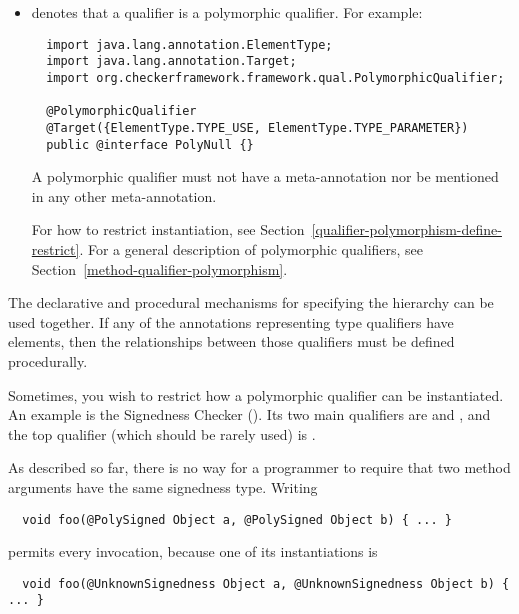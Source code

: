 \begin{itemize}
\item {} denotes that a qualifier is a
  polymorphic qualifier.  For example:

\begin{Verbatim}
  import java.lang.annotation.ElementType;
  import java.lang.annotation.Target;
  import org.checkerframework.framework.qual.PolymorphicQualifier;

  @PolymorphicQualifier
  @Target({ElementType.TYPE_USE, ElementType.TYPE_PARAMETER})
  public @interface PolyNull {}
\end{Verbatim}

  A polymorphic qualifier must not have
  a  meta-annotation nor be
  mentioned in any other 
  meta-annotation.

  For how to restrict instantiation, see Section~\ref{qualifier-polymorphism-define-restrict}.
  For a general description of polymorphic qualifiers, see
  Section~\ref{method-qualifier-polymorphism}.

\end{itemize}

The declarative and procedural mechanisms for specifying the hierarchy can
be used together. If any of the annotations representing type qualifiers have elements, then
the relationships between those qualifiers must be defined procedurally.



Sometimes, you wish to restrict how a polymorphic qualifier can be
instantiated.  An example is the Signedness Checker
().  Its two main qualifiers are
 and
, and the top qualifier
(which should be rarely used) is
.

As described so far, there is no way for a programmer to require that two
method arguments have the same signedness type.  Writing

\begin{Verbatim}
  void foo(@PolySigned Object a, @PolySigned Object b) { ... }
\end{Verbatim}

\noindent
permits every invocation, because one of its instantiations is

\begin{Verbatim}
  void foo(@UnknownSignedness Object a, @UnknownSignedness Object b) { ... }
\end{Verbatim}

